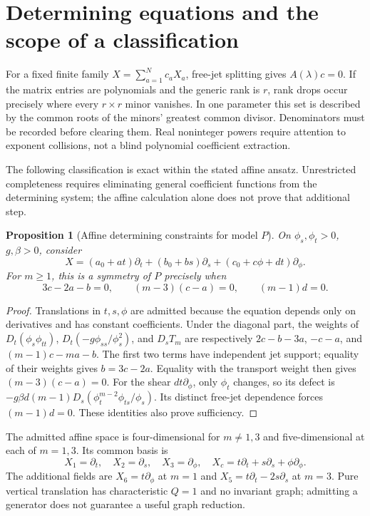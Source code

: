\documentclass[11pt,a4paper,oneside]{report}
\numberwithin{equation}{chapter}
\newtheorem{proposition}[theorem]{Proposition}
\begin{document}
\section{Determining equations and the scope of a classification}
For a fixed finite family $X=\sum_{a=1}^Nc_aX_a$, free-jet splitting gives $A(\lambda)c=0$. If the matrix entries are polynomials and the generic rank is $r$, rank drops occur precisely where every $r\times r$ minor vanishes. In one parameter this set is described by the common roots of the minors' greatest common divisor. Denominators must be recorded before clearing them. Real noninteger powers require attention to exponent collisions, not a blind polynomial coefficient extraction.

The following classification is exact within the stated affine ansatz. Unrestricted completeness requires eliminating general coefficient functions from the determining system; the affine calculation alone does not prove that additional step.

\begin{proposition}[Affine determining constraints for model $P$]\label{prop:affine}
On $\phi_s,\phi_t>0$, $g,\beta>0$, consider
\begin{equation}
X=(a_0+at)\partial_t+(b_0+bs)\partial_s
 +(c_0+c\phi+dt)\partial_\phi.
\end{equation}
For $m\ge1$, this is a symmetry of $P$ precisely when
\begin{equation}\label{eq:affine}
3c-2a-b=0,\qquad (m-3)(c-a)=0,\qquad (m-1)d=0.
\end{equation}
\end{proposition}
\begin{proof}
Translations in $t,s,\phi$ are admitted because the equation depends only on derivatives and has constant coefficients. Under the diagonal part, the weights of $D_t(\phi_s\phi_{tt})$, $D_t(-g\phi_{ss}/\phi_s^2)$, and $D_sT_m$ are respectively
$2c-b-3a$, $-c-a$, and $(m-1)c-ma-b$.
The first two terms have independent jet support; equality of their weights gives $b=3c-2a$. Equality with the transport weight then gives $(m-3)(c-a)=0$. For the shear $dt\partial_\phi$, only $\phi_t$ changes, so its defect is
$-g\beta d(m-1)D_s(\phi_t^{m-2}\phi_{ts}/\phi_s)$. Its distinct free-jet dependence forces $(m-1)d=0$. These identities also prove sufficiency.\end{proof}
The admitted affine space is four-dimensional for $m\ne1,3$ and five-dimensional at each of $m=1,3$. Its common basis is
\begin{equation}
X_1=\partial_t,\quad X_2=\partial_s,\quad X_3=\partial_\phi,\quad
X_c=t\partial_t+s\partial_s+\phi\partial_\phi.
\end{equation}
The additional fields are $X_6=t\partial_\phi$ at $m=1$ and $X_5=t\partial_t-2s\partial_s$ at $m=3$. Pure vertical translation has characteristic $Q=1$ and no invariant graph; admitting a generator does not guarantee a useful graph reduction.
\end{document}
